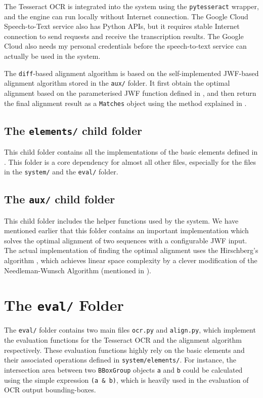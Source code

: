 The Tesseract OCR is integrated into the system using the \texttt{pytesseract} wrapper, and the engine can run locally without Internet connection. The Google Cloud Speech-to-Text service also has Python APIs, but it requires stable Internet connection to send requests and receive the transcription results. The Google Cloud also needs my personal credentials before the speech-to-text service can actually be used in the system.

The \texttt{diff}-based alignment algorithm is based on the self-implemented JWF-based alignment algorithm stored in the \texttt{aux/} folder. It first obtain the optimal alignment based on the parameterised JWF function defined in , and then return the final alignment result as a \texttt{Matches} object using the method explained in .

\subsection{The \texttt{elements/} child folder}

This child folder contains all the implementations of the basic elements defined in . This folder is a core dependency for almost all other files, especially for the files in the \texttt{system/} and the \texttt{eval/} folder.

\subsection{The \texttt{aux/} child folder}

This child folder includes the helper functions used by the system. We have mentioned earlier that this folder contains an important implementation which solves the optimal alignment of two sequences with a configurable JWF input. The actual implementation of finding the optimal alignment uses the Hirschberg's algorithm \cite{hirschberg1975linear}, which achieves linear space complexity by a clever modification of the Needleman-Wunsch Algorithm (mentioned in ).


\section{The \texttt{eval/} Folder}

The \texttt{eval/} folder contains two main files \texttt{ocr.py} and \texttt{align.py}, which implement the evaluation functions for the Tesseract OCR and the alignment algorithm respectively. These evaluation functions highly rely on the basic elements and their associated operations defined in \texttt{system/elements/}. For instance, the intersection area between two \texttt{BBoxGroup} objects \texttt{a} and \texttt{b} could be calculated using the simple expression \texttt{(a \& b)}, which is heavily used in the evaluation of OCR output bounding-boxes.


